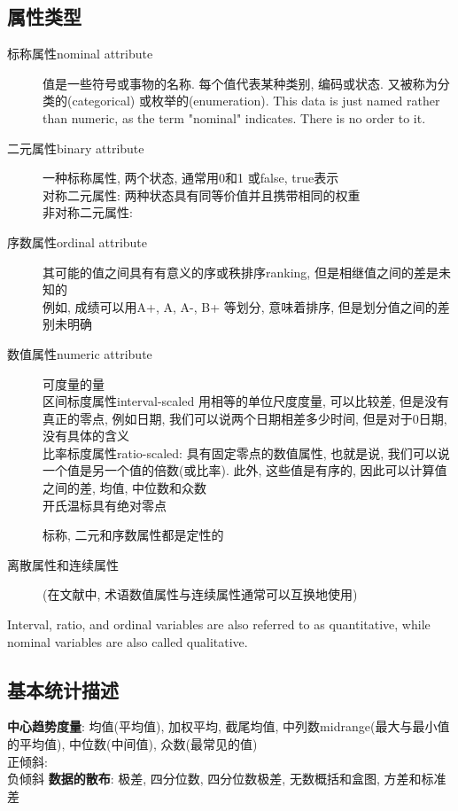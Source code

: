 \documentclass{article}
\begin{document}
\subsection{属性类型}
\begin{description}
\item[标称属性nominal attribute] 值是一些符号或事物的名称. 每个值代表某种类别, 编码或状态. 又被称为分类的(categorical) 或枚举的(enumeration). 
		This data is just named rather than numeric, as the term "nominal" indicates. There is no order to it. 
\item[二元属性binary attribute] 一种标称属性, 两个状态, 通常用0和1 或false, true表示\\
对称二元属性: 两种状态具有同等价值并且携带相同的权重\\
非对称二元属性:
\item[序数属性ordinal attribute] 其可能的值之间具有有意义的序或秩排序ranking, 但是相继值之间的差是未知的\\
例如, 成绩可以用A+, A, A-, B+ 等划分, 意味着排序, 但是划分值之间的差别未明确
\item[数值属性numeric attribute] 可度量的量\\
	区间标度属性interval-scaled 用相等的单位尺度度量, 可以比较差, 但是没有真正的零点, 例如日期, 我们可以说两个日期相差多少时间, 但是对于0日期, 没有具体的含义\\
	比率标度属性ratio-scaled: 具有固定零点的数值属性, 也就是说, 我们可以说一个值是另一个值的倍数(或比率). 此外, 这些值是有序的, 因此可以计算值之间的差, 均值, 中位数和众数\\
	开氏温标具有绝对零点\par
标称, 二元和序数属性都是定性的
\item[离散属性和连续属性] (在文献中, 术语数值属性与连续属性通常可以互换地使用)
\end{description}

Interval, ratio, and ordinal variables are also referred to as quantitative,   
while nominal variables are also called qualitative.

\subsection{基本统计描述}
\textbf{中心趋势度量}: 均值(平均值), 加权平均, 截尾均值, 中列数midrange(最大与最小值的平均值), 中位数(中间值), 众数(最常见的值)\\
	正倾斜:\\
	负倾斜
\textbf{数据的散布}: 极差, 四分位数, 四分位数极差, 无数概括和盒图, 方差和标准差
\end{document}
